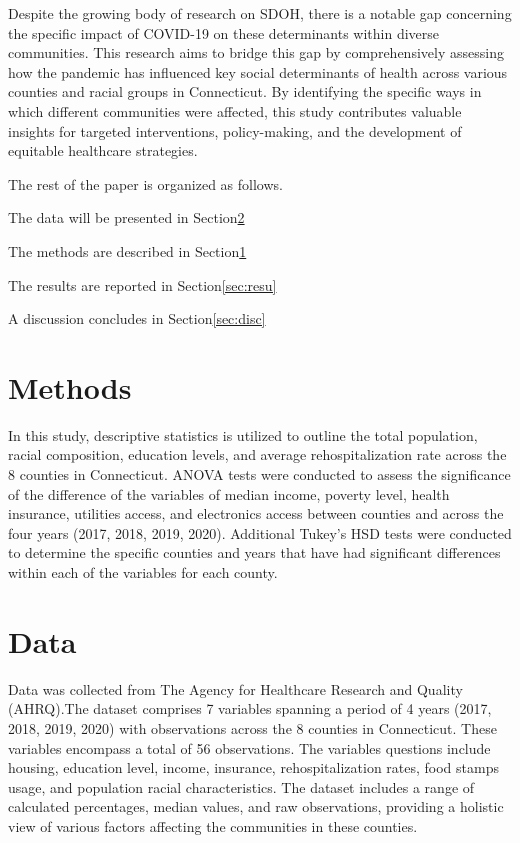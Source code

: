 \documentclass[12pt]{article}
\begin{document}
Despite the growing body of research on SDOH, there is a notable gap concerning the specific impact of COVID-19 on 
these determinants within diverse communities. This research aims to bridge this gap by comprehensively assessing how 
the pandemic has influenced key social determinants of health across various counties and racial groups in Connecticut. 
By identifying the specific ways in which different communities were affected, this study contributes valuable insights 
for targeted interventions, policy-making, and the development of equitable healthcare strategies.


The rest of the paper is organized as follows.

The data will be presented in Section\ref{sec:data}

The methods are described in Section\ref{sec:meth}

The results are reported in Section\ref{sec:resu}

A discussion concludes in Section\ref{sec:disc}

\section{Methods}\label{sec:meth}

In this study, descriptive statistics is utilized to outline the total population, racial composition, 
education levels, and average rehospitalization rate across the 8 counties in Connecticut. ANOVA tests were 
conducted to assess the significance of the difference of the variables of median income, poverty level, health insurance, 
utilities access, and electronics access between counties and across the four years (2017, 2018, 2019, 2020). Additional 
Tukey's HSD tests were conducted to determine the specific counties and years that have had significant differences within 
each of the variables for each county.

\section{Data}\label{sec:data}

Data was collected from The Agency for Healthcare Research and Quality (AHRQ).The dataset comprises 7 variables 
spanning a period of 4 years (2017, 2018, 2019, 2020) with observations across the 8 counties in Connecticut. These variables 
encompass a total of 56 observations. The variables questions include housing, education level, income, insurance,
rehospitalization rates, food stamps usage, and population racial characteristics. The dataset includes a range of 
calculated percentages, median values, and raw observations, providing a holistic view of various factors affecting 
the communities in these counties. 
\end{document}
